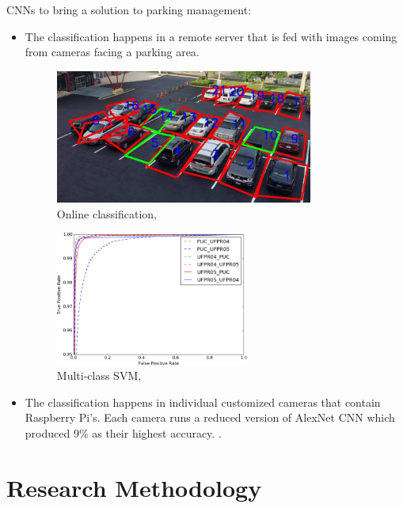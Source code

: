 \documentclass{beamer}
\begin{document}
\begin{frame}[allowframebreaks]
CNNs to bring a solution to parking management:

\begin{itemize}
	\item The classification happens in a remote server that is fed with images coming from cameras facing a parking area. 
	\begin{figure}[h!]
		\centering
		\includegraphics[width=0.8\textwidth]{Pictures/stall}
		\caption{Online classification, \cite{7845408}}
	\end{figure} 
	
	\begin{figure}[h!]
		\centering
		\includegraphics[width=0.6\textwidth]{Pictures/roc-auc}
		\caption{Multi-class SVM, \cite{7845408}}
	\end{figure}

\item The classification happens in individual customized cameras that contain Raspberry Pi's. Each camera runs a reduced version of AlexNet CNN which produced 9\% as their highest accuracy. \cite{Amato2017327}.
	 
\end{itemize}


\end{frame}

\section{Research Methodology}
\end{document}
